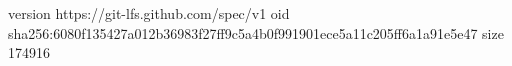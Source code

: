 version https://git-lfs.github.com/spec/v1
oid sha256:6080f135427a012b36983f27ff9c5a4b0f991901ece5a11c205ff6a1a91e5e47
size 174916
